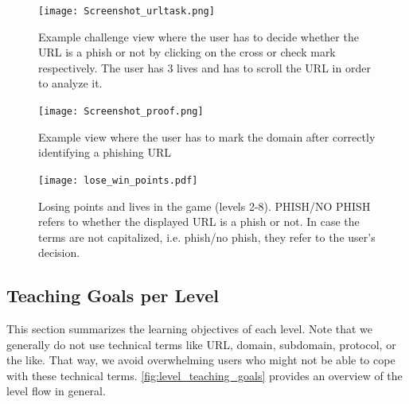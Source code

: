 \begin{figure}[hHtbp]
\centering
\texttt{[image: Screenshot\_urltask.png]}
\caption{Example challenge view where the user has to decide whether the URL is a phish or not by clicking on the cross or check mark respectively. The user has 3 lives and has to scroll the URL in order to analyze it.}
\label{fig:Screenshot_urltask}
\end{figure}


\begin{figure}[hHtbp]
\centering
\texttt{[image: Screenshot\_proof.png]}
\caption{Example view where the user has to mark the domain after correctly identifying a phishing URL}
\label{fig:Screenshot_proof}
\end{figure}

\begin{figure}[hHtbp]
\centering
\texttt{[image: lose\_win\_points.pdf]}
\caption{Losing points and lives in the game (levels 2-8). PHISH/NO PHISH refers to whether the displayed URL is a phish or not. In case the terms are not capitalized, i.e. phish/no phish, they refer to the user's decision.}
\label{fig:lose_points_life}
\end{figure}

\subsection{Teaching Goals per Level}
\label{s:knowledgetransferperlevel}
This section summarizes the learning objectives of each level.
 Note that we generally do not use technical terms like URL, domain, subdomain, protocol, or the like. 
That way, we avoid overwhelming users who might not be able to cope with these technical terms.
\autoref{fig:level_teaching_goals} provides an overview of the level flow in general.


